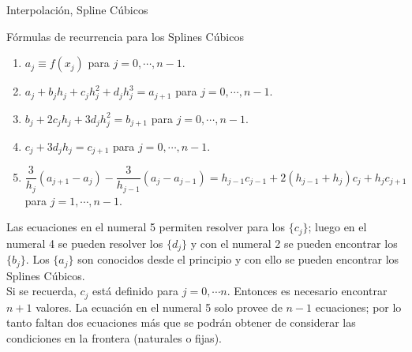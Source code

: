 \begin{frame}[allowframebreaks]{Interpolación, Spline Cúbicos}
\begin{block}{Fórmulas de recurrencia para los Splines Cúbicos}
\begin{enumerate}
\item $a_j\equiv f(x_j)$ para $j=0,\cdots, n-1$.
\item $a_j+b_jh_j+c_jh_j^2+d_jh_j^3=a_{j+1}$ para $j=0,\cdots, n-1$.
\item $b_j+2c_jh_j+3d_jh_j^2=b_{j+1}$ para $j=0,\cdots, n-1$.
\item $c_j+3d_jh_j=c_{j+1}$ para $j=0,\cdots, n-1$.
\item $\dfrac{3}{h_j}(a_{j+1}-a_j)-\dfrac{3}{h_{j-1}}(a_j-a_{j-1})=h_{j-1}c_{j-1}+2(h_{j-1}+h_j)c_j+h_jc_{j+1}$ para $j=1,\cdots, n-1$.
\end{enumerate}
\end{block}
\indent Las ecuaciones en el numeral 5 permiten resolver para los $\{c_j\}$; luego en el numeral 4 se pueden resolver los $\{d_j\}$ y con el numeral 2 se pueden encontrar los $\{b_j\}$. Los $\{a_j\}$ son conocidos desde el principio y con ello se pueden encontrar los Splines Cúbicos. \\
\indent Si se recuerda, $c_j$ está definido para $j=0,\cdots n$. Entonces es necesario encontrar $n+1$ valores. La ecuación en el numeral 5 solo provee de $n-1$ ecuaciones; por lo tanto faltan dos ecuaciones más que se podrán obtener de considerar las condiciones en la frontera (naturales o fijas). 
\end{frame}
